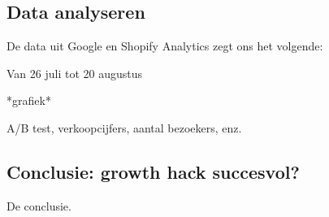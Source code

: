 \subsection{Data analyseren} \label{sec:data-analyseren}
De data uit Google en Shopify Analytics zegt ons het volgende:

Van 26 juli tot 20 augustus

*grafiek*

A/B test, verkoopcijfers, aantal bezoekers, enz.



\subsection{Conclusie: growth hack succesvol?} \label{sec:conclusie-growth-hack-succesvol}
De conclusie.
